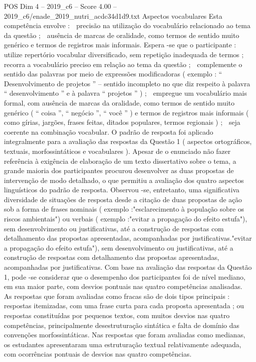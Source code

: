 \begin{textsample}{POS Dim 4 – 2019\_c6 – Score 4.00 – 2019\_c6/enade\_2019\_nutri\_acdc34d1d9.txt}
Aspectos vocabulares Esta competência envolve :  precisão na utilização do vocabulário relacionado ao tema da questão ;  ausência de marcas de oralidade, como termos de sentido muito genérico e termos de registros mais informais.
Espera -se que o participante :  utilize repertório vocabular diversificado, sem repetição inadequada de termos ;  recorra a vocabulário preciso em relação ao tema da questão ;  complemente o sentido das palavras por meio de expressões modificadoras ( exemplo : “ Desenvolvimento de projetos ” – sentido incompleto no que diz respeito à palavra “ desenvolvimento ” e à palavra “ projetos ” ) ;  empregue um vocabulário mais formal, com ausência de marcas da oralidade, como termos de sentido muito genérico ( “ coisa ”, “ negócio ”, “ você ” ) e termos de registros mais informais ( como gírias, jargões, frases feitas, ditados populares, termos regionais ) ;  seja coerente na combinação vocabular.
O padrão de resposta foi aplicado integralmente para a avaliação das respostas da Questão 1 ( aspectos ortográficos, textuais, morfossintáticos e vocabulares ).
Apesar de o enunciado não fazer referência à exigência de elaboração de um texto dissertativo sobre o tema, a grande maioria dos participantes procurou desenvolver as duas propostas de intervenção de modo detalhado, o que permitiu a avaliação dos quatro aspectos linguísticos do padrão de resposta.
Observou -se, entretanto, uma significativa diversidade de situações de resposta desde a citação de duas propostas de ação sob a forma de frases nominais ( exemplo :"esclarecimento à população sobre os riscos ambientais") ou verbais ( exemplo :"evitar a propagação do efeito estufa"), sem desenvolvimento ou justificativas, até a construção de respostas com detalhamento das propostas apresentadas, acompanhadas por justificativas."evitar a propagação do efeito estufa"), sem desenvolvimento ou justificativas, até a construção de respostas com detalhamento das propostas apresentadas, acompanhadas por justificativas.
Com base na avaliação das respostas da Questão 1, pode -se considerar que o desempenho dos participantes foi de nível mediano, em sua maior parte, com desvios pontuais nas quatro competências analisadas.
As respostas que foram avaliadas como fracas são de dois tipos principais : respostas itemizadas, com uma frase curta para cada proposta apresentada ; ou respostas constituídas por pequenos textos, com muitos desvios nas quatro competências, principalmente desestruturação sintática e falta de domínio das convenções morfossintáticas.
Nas respostas que foram avaliadas como medianas, os estudantes apresentaram uma estruturação textual relativamente adequada, com ocorrências pontuais de desvios nas quatro competências.

\end{textsample}
